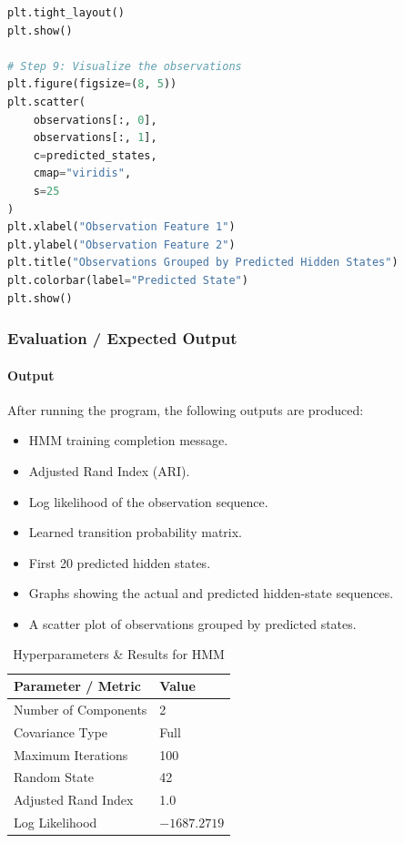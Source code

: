 \documentclass[a4paper,11pt]{article}
\begin{document}
\begin{itemize}
\begin{lstlisting}[language=Python, caption={HMM Implementation}]
plt.tight_layout()
plt.show()

# Step 9: Visualize the observations
plt.figure(figsize=(8, 5))
plt.scatter(
    observations[:, 0],
    observations[:, 1],
    c=predicted_states,
    cmap="viridis",
    s=25
)
plt.xlabel("Observation Feature 1")
plt.ylabel("Observation Feature 2")
plt.title("Observations Grouped by Predicted Hidden States")
plt.colorbar(label="Predicted State")
plt.show()
\end{lstlisting}

\subsubsection{Evaluation / Expected Output}

\paragraph{Output}
After running the program, the following outputs are produced:
\begin{itemize}
    \item HMM training completion message.
    \item Adjusted Rand Index (ARI).
    \item Log likelihood of the observation sequence.
    \item Learned transition probability matrix.
    \item First 20 predicted hidden states.
    \item Graphs showing the actual and predicted hidden-state sequences.
    \item A scatter plot of observations grouped by predicted states.
\end{itemize}

\begin{table}[H]
\centering
\caption{Hyperparameters \& Results for HMM}
\begin{tabular}{ll}
\toprule
\textbf{Parameter / Metric} & \textbf{Value} \\
\midrule
Number of Components   & 2 \\
Covariance Type        & Full \\
Maximum Iterations     & 100 \\
Random State           & 42 \\
Adjusted Rand Index    & 1.0 \\
Log Likelihood         & $-1687.2719$ \\
\bottomrule
\end{tabular}
\end{table}


\end{itemize}
\end{document}

